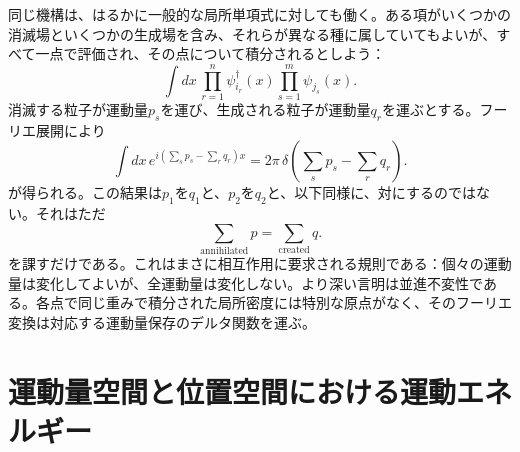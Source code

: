 \begin{classroomqa}
\end{classroomqa}

同じ機構は、はるかに一般的な局所単項式に対しても働く。ある項がいくつかの消滅場といくつかの生成場を含み、それらが異なる種に属していてもよいが、すべて一点で評価され、その点について積分されるとしよう：
\begin{equation}
\int dx\,
\prod_{r=1}^{n} \psi_{i_r}^\dagger(x)
\prod_{s=1}^{m} \psi_{j_s}(x).
\end{equation}
消滅する粒子が運動量\(p_s\)を運び、生成される粒子が運動量\(q_r\)を運ぶとする。フーリエ展開により
\begin{equation}
\int dx\,
e^{i(\sum_s p_s-\sum_r q_r)x}
=2\pi\,
\delta\!\left(\sum_s p_s-\sum_r q_r\right).
\label{eq:l9-total-momentum-delta}
\end{equation}
が得られる。この結果は\(p_1\)を\(q_1\)と、\(p_2\)を\(q_2\)と、以下同様に、対にするのではない。それはただ
\begin{equation}
\sum_{\mathrm{annihilated}}p
=
\sum_{\mathrm{created}}q.
\end{equation}
を課すだけである。これはまさに相互作用に要求される規則である：個々の運動量は変化してよいが、全運動量は変化しない。より深い言明は並進不変性である。各点で同じ重みで積分された局所密度には特別な原点がなく、そのフーリエ変換は対応する運動量保存のデルタ関数を運ぶ。

\begin{classroomqa}
\end{classroomqa}

\section{運動量空間と位置空間における運動エネルギー}


